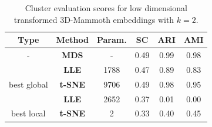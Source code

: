 \begin{table}[]
\centering
\begin{tabular}{|c|c|c|c|c|c|}
\hline
\textbf{Type}            & \textbf{Method}                       & \textbf{Param.}          & \textbf{SC} & \textbf{ARI} & \textbf{AMI} \\ \hline
-                        & {\color[HTML]{1B9E77} \textbf{MDS}}   & {\color[HTML]{1B9E77} -} & 0.49        & 0.99         & 0.98         \\ \hline
                         & {\color[HTML]{D95F02} \textbf{LLE}}   & 1788                     & 0.47        & 0.89         & 0.83         \\ \cline{2-6} 
\multirow{-2}{*}{best global} & {\color[HTML]{7570B3} \textbf{t-SNE}} & 9706                     & 0.49        & 0.98         & 0.95         \\ \hline
                         & {\color[HTML]{D95F02} \textbf{LLE}}   & 2652                     & 0.37        & 0.01         & 0.00         \\ \cline{2-6} 
\multirow{-2}{*}{best local}  & {\color[HTML]{7570B3} \textbf{t-SNE}} & 2                        & 0.33        & 0.40         & 0.45         \\ \hline
\end{tabular}
\caption[Cluster Evaluation on Transformed 3D-Mammoth]{Cluster evaluation scores for low dimensional transformed 3D-Mammoth embeddings with $k=2$.}
\label{tab:clu_trans_mammoth}
\end{table}

